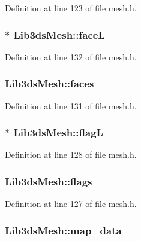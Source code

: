 Definition at line 123 of file mesh.\-h.

\hypertarget{struct_lib3ds_mesh_a4725feec326e5ee7f6856f53484397ac}{
\subsubsection[{face\-L}]{$\ast$ Lib3ds\-Mesh\-::face\-L}}\label{struct_lib3ds_mesh_a4725feec326e5ee7f6856f53484397ac}


Definition at line 132 of file mesh.\-h.

\hypertarget{struct_lib3ds_mesh_af14743c50dc2dccc8bc7e9bab23028fd}{
\subsubsection[{faces}]{ Lib3ds\-Mesh\-::faces}}\label{struct_lib3ds_mesh_af14743c50dc2dccc8bc7e9bab23028fd}


Definition at line 131 of file mesh.\-h.

\hypertarget{struct_lib3ds_mesh_ad954a1b0ae2fa69f836c21b56940c113}{
\subsubsection[{flag\-L}]{$\ast$ Lib3ds\-Mesh\-::flag\-L}}\label{struct_lib3ds_mesh_ad954a1b0ae2fa69f836c21b56940c113}


Definition at line 128 of file mesh.\-h.

\hypertarget{struct_lib3ds_mesh_ac3aa76003f7bc2acb8fe0f81b01a13bc}{
\subsubsection[{flags}]{ Lib3ds\-Mesh\-::flags}}\label{struct_lib3ds_mesh_ac3aa76003f7bc2acb8fe0f81b01a13bc}


Definition at line 127 of file mesh.\-h.

\hypertarget{struct_lib3ds_mesh_abab3a779231107ce94233813e5c81eee}{
\subsubsection[{map\-\_\-data}]{ Lib3ds\-Mesh\-::map\-\_\-data}}\label{struct_lib3ds_mesh_abab3a779231107ce94233813e5c81eee}


